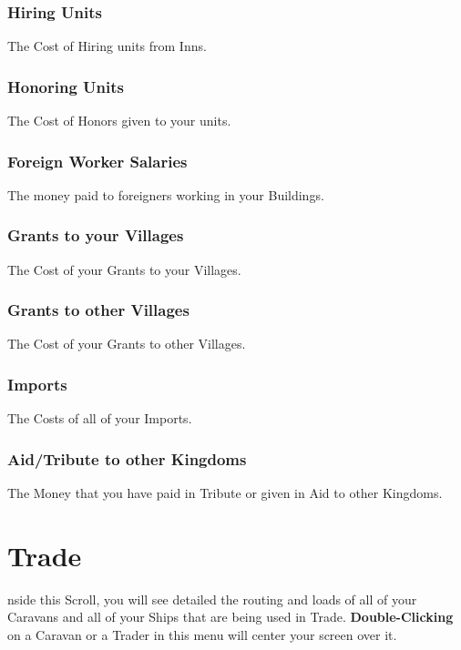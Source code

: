 \subsubsection{Hiring Units}

The Cost of Hiring units from Inns.

\subsubsection{Honoring Units}

The Cost of Honors given to your units.

\subsubsection{Foreign Worker Salaries}

The money paid to foreigners working in your Buildings.

\subsubsection{Grants to your Villages}

The Cost of your Grants to your Villages.

\subsubsection{Grants to other Villages}

The Cost of your Grants to other Villages.

\subsubsection{Imports}

The Costs of all of your Imports.

\subsubsection{Aid/Tribute to other Kingdoms}

The Money that you have paid in Tribute or given in Aid to other Kingdoms.

\section{Trade}


nside this Scroll, you will see detailed the routing and loads of all of your Caravans and all of your Ships that are being used in Trade. \textbf{Double-Clicking} on a Caravan or a Trader in this menu will center your screen over it.

